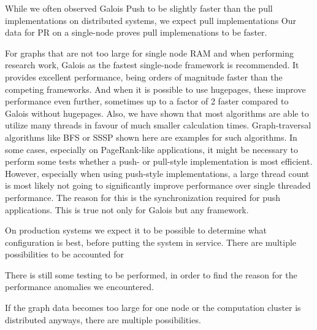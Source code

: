 While we often observed Galois Push to be slightly faster than the pull implementations on distributed systems, we expect pull implementations 
Our data for PR on a single-node proves pull implemenations to be faster.











For graphs that are not too large for single node RAM and when performing research work, Galois as the fastest single-node framework is recommended.
It provides excellent performance, being orders of magnitude faster than the competing frameworks. And when it is possible to use hugepages, these improve performance even further, sometimes up to a factor of 2 faster compared to Galois without hugepages.
Also, we have shown that most algorithms are able to utilize many threads in favour of much smaller calculation times. Graph-traversal algorithms like BFS or SSSP shown here are examples for such algorithms.
In some cases, especially on PageRank-like applications, it might be necessary to perform some tests whether a push- or pull-style implementation is most efficient.
However, especially when using push-style implementations, a large thread count is most likely not going to significantly improve performance over single threaded performance. The reason for this is the synchronization required for push applications. This is true not only for Galois but any framework.


On production systems we expect it to be possible to determine what configuration is best, before putting the system in service.
There are multiple possibilities to be accounted for









There is still some testing to be performed, in order to find the reason for the performance anomalies we encountered. 




If the graph data becomes too large for one node or the computation cluster is distributed anyways, there are multiple possibilities.

